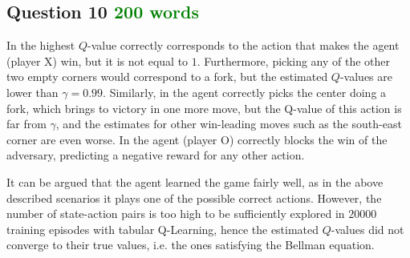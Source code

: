 \documentclass[10pt]{IEEEtran}
\begin{document}
\subsection*{Question 10  \textcolor{green}{200 words}}
In  the highest $Q$-value correctly corresponds to the action that makes the agent (player X) win, but it is not equal to $1$. Furthermore, picking any of the other two empty corners would correspond to a fork, but the estimated $Q$-values are lower than $\gamma = 0.99$. Similarly, in  the agent correctly picks the center doing a fork, which brings to victory in one more move, but the Q-value of this action is far from $\gamma$, and the estimates for other win-leading moves such as the south-east corner are even worse. In  the agent (player O) correctly blocks the win of the adversary, predicting a negative reward for any other action.

It can be argued that the agent learned the game fairly well, as in the above described scenarios it plays one of the possible correct actions. However, the number of state-action pairs is too high to be sufficiently explored in $20000$ training episodes with tabular Q-Learning, hence the estimated $Q$-values did not converge to their true values, i.e. the ones satisfying the Bellman equation. 
\end{document}

